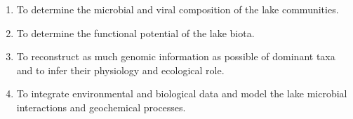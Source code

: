 \documentclass{book}
\begin{document}
\begin{enumerate}[1)]
\item
  To determine the microbial and viral composition of the lake
  communities.

\item
  To determine the functional potential of the lake biota.

\item
  To reconstruct as much genomic information as possible of dominant taxa and to infer their physiology and ecological role.

\item
  To integrate environmental and biological data and model the lake microbial interactions and geochemical processes.

\end{enumerate}
\end{document}
